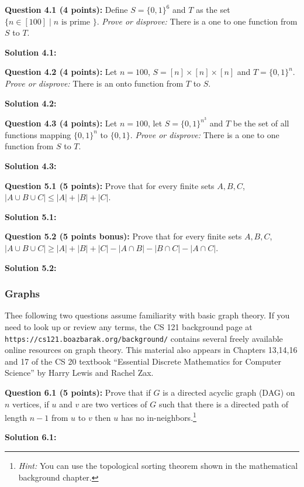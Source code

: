 \documentclass[11pt]{article}
\begin{document}
\textbf{Question 4.1 (4 points):} Define \(S = \{0,1\}^6\) and \(T\) as
the set \(\{ n \in [100] \;|\; \mbox{$n$ is prime } \}\). \emph{Prove or
disprove:} There is a one to one function from \(S\) to \(T\).

\textbf{Solution 4.1:}

\textbf{Question 4.2 (4 points):} Let \(n=100\),
\(S = [n] \times [n] \times [n]\) and \(T=\{0,1\}^n\). \emph{Prove or
disprove:} There is an onto function from \(T\) to \(S\).

\textbf{Solution 4.2:}

\textbf{Question 4.3 (4 points):} Let \(n=100\), let
\(S = \{0,1\}^{n^3}\) and \(T\) be the set of all functions mapping
\(\{0,1\}^n\) to \(\{0,1\}\). \emph{Prove or disprove:} There is a one
to one function from \(S\) to \(T\).

\textbf{Solution 4.3:}

\textbf{Question 5.1 (5 points):} Prove that for every finite sets
\(A,B,C\), \(|A \cup B \cup C| \leq |A|+|B|+|C|\).

\textbf{Solution 5.1:}

\textbf{Question 5.2 (5 points bonus):} Prove that for every finite sets
\(A,B,C\),
\(|A \cup B \cup C| \geq |A|+|B|+|C| - |A \cap B| - |B \cap C| - |A \cap C|\).

\textbf{Solution 5.2:}


\subsubsection{Graphs}\label{graphs}

Thee following two questions assume familiarity with basic graph theory.
If you need to look up or review any terms, the CS 121 background page at
{\tt https://cs121.boazbarak.org/background/}
contains several freely available online resources on graph theory. This
material also appears in Chapters 13,14,16 and 17 of the CS 20 textbook
``Essential Discrete Mathematics for Computer Science'' by Harry Lewis
and Rachel Zax.

\textbf{Question 6.1 (5 points):} Prove that if \(G\) is a directed
acyclic graph (DAG) on \(n\) vertices, if \(u\) and \(v\) are two
vertices of \(G\) such that there is a directed path of length \(n-1\)
from \(u\) to \(v\) then \(u\) has no in-neighbors.\footnote{\emph{Hint:}
  You can use the topological sorting theorem shown in the mathematical
  background chapter.}

\textbf{Solution 6.1:}
\end{document}

